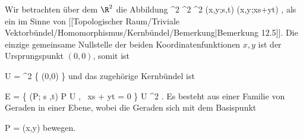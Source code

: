 {

Wir betrachten über dem $\R^2$ die Abbildung
\maabbeledisp {} {\R^2 \times \R^2} { \R^2 \times \R
} {(x,y;s,t)} { (x,y;xs+yt)
} {,}
als ein
im Sinne von
[[Topologischer Raum/Triviale Vektorbündel/Homomorphismus/Kernbündel/Bemerkung|Bemerkung 12.5]].
Die einzige gemeinsame Nullstelle der beiden Koordinatenfunktionen $x,y$ ist der Ursprungspunkt $(0,0)$, somit ist

\mavergleichskette
{\vergleichskette
{ U
}
{ = }{ \R^2 \setminus \{ (0,0) \}
}
{  }{
}
{    }{
}
{   }{
}
}
{}{}{}
und das zugehörige Kernbündel ist

\mavergleichskettedisp
{\vergleichskette
{ E
}
{ =} { \left\{  (P; s ,t)   \mid   P \in U  , \,  xs + yt = 0       \right\}
}
{ \subseteq} { U \times \R^2
}
{ } {
}
{ } {
}
}
{}{}{.}
Es besteht aus einer Familie von Geraden in einer Ebene, wobei die Geraden sich mit dem Basispunkt

\mavergleichskette
{\vergleichskette
{ P
}
{ = }{ (x,y)
}
{  }{
}
{    }{
}
{   }{
}
}
{}{}{}
bewegen.

}

